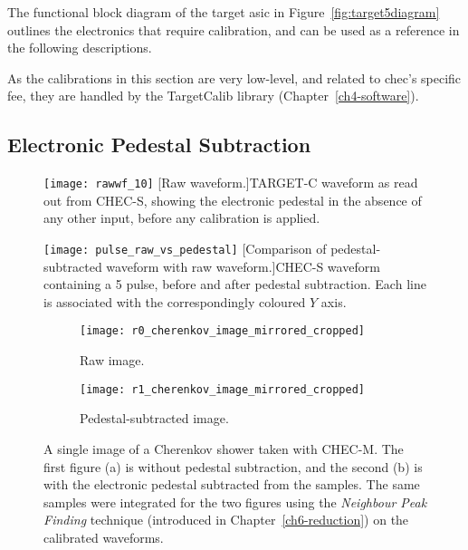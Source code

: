 The functional block diagram of the \gls{target} \gls{asic} in Figure~\ref{fig:target5diagram} outlines the electronics that require calibration, and can be used as a reference in the following descriptions.

As the calibrations in this section are very low-level, and related to \gls{chec}'s specific \gls{fee}, they are handled by the TargetCalib library (Chapter~\ref{ch4-software}).

\subsection{Electronic Pedestal Subtraction}

\begin{figure}
\begin{minipage}[t]{.49\textwidth}
  \centering
  \texttt{[image: rawwf\_10]} 
  [Raw waveform.]{TARGET-C waveform as read out from CHEC-S, showing the electronic pedestal in the absence of any other input, before any calibration is applied.}
  \label{fig:rawwf}
\end{minipage}%
\hfill
\begin{minipage}[t]{.49\textwidth}
  \centering
  \texttt{[image: pulse\_raw\_vs\_pedestal]}
  [Comparison of pedestal-subtracted waveform with raw waveform.]{CHEC-S waveform containing a \SI{5}{\pe} pulse, before and after pedestal subtraction. Each line is associated with the correspondingly coloured $Y$ axis.}
  \label{fig:pulse_raw_vs_pedestal}
\end{minipage}
\end{figure}

\begin{figure}
  \begin{subfigure}[b]{0.49\textwidth}
    \texttt{[image: r0\_cherenkov\_image\_mirrored\_cropped]}
    \caption{Raw image.}
    \label{fig:r0_cherenkov_image_mirrored_cropped}
  \end{subfigure}
  \hfill
  \begin{subfigure}[b]{0.49\textwidth}
    \texttt{[image: r1\_cherenkov\_image\_mirrored\_cropped]}
    \caption{Pedestal-subtracted image.}
    \label{fig:r1_cherenkov_image_mirrored_cropped}
  \end{subfigure}
  \caption[Effect of pedestal subtraction of Cherenkov shower image.]{A single image of a Cherenkov shower taken with CHEC-M. The first figure (a) is without pedestal subtraction, and the second (b) is with the electronic pedestal subtracted from the samples. The same samples were integrated for the two figures using the \textit{Neighbour Peak Finding} technique (introduced in Chapter~\ref{ch6-reduction}) on the calibrated waveforms.}
\end{figure}

